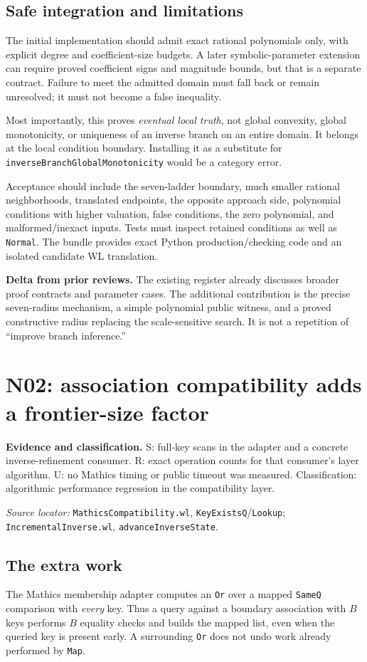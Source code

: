 \documentclass[11pt,letterpaper]{article}
\newcommand{\code}[1]{\nolinkurl{#1}}
\newcommand{\source}[1]{\par\textit{Source locator:} #1\par}
\newcommand{\status}[1]{\par\textbf{Evidence and classification.} #1\par}
\newcommand{\novelty}[1]{\par\textbf{Delta from prior reviews.} #1\par}
\begin{document}
\subsection{Safe integration and limitations}
The initial implementation should admit exact rational polynomials only,
with explicit degree and coefficient-size budgets. A later symbolic-parameter
extension can require proved coefficient signs and magnitude bounds, but
that is a separate contract. Failure to meet the admitted domain must fall
back or remain unresolved; it must not become a false inequality.

Most importantly, this proves \emph{eventual local truth}, not global
convexity, global monotonicity, or uniqueness of an inverse branch on an
entire domain. It belongs at the local condition boundary. Installing it as
a substitute for \code{inverseBranchGlobalMonotonicity} would be a category
error.

Acceptance should include the seven-ladder boundary, much smaller rational
neighborhoods, translated endpoints, the opposite approach side, polynomial
conditions with higher valuation, false conditions, the zero polynomial,
and malformed/inexact inputs. Tests must inspect retained conditions as well
as \code{Normal}. The bundle provides exact Python production/checking code
and an isolated candidate WL translation.

\novelty{The existing register already discusses broader proof contracts
and parameter cases. The additional contribution is the precise seven-radius
mechanism, a simple polynomial public witness, and a proved constructive
radius replacing the scale-sensitive search. It is not a repetition of
``improve branch inference.''}

\section{N02: association compatibility adds a frontier-size factor}
\label{sec:membership}
\status{S: full-key scans in the adapter and a concrete inverse-refinement
consumer. R: exact operation counts for that consumer's layer algorithm.
U: no Mathics timing or public timeout was measured. Classification:
algorithmic performance regression in the compatibility layer.}
\source{\code{MathicsCompatibility.wl}, \code{KeyExistsQ}/\code{Lookup};
\code{IncrementalInverse.wl}, \code{advanceInverseState}.
\cite{repo-mcompat,repo-incremental}}

\subsection{The extra work}
The Mathics membership adapter computes an \code{Or} over a mapped
\code{SameQ} comparison with \emph{every} key. Thus a query against a boundary
association with $B$ keys performs $B$ equality checks and builds the mapped
list, even when the queried key is present early. A surrounding \code{Or}
does not undo work already performed by \code{Map}.
\end{document}
